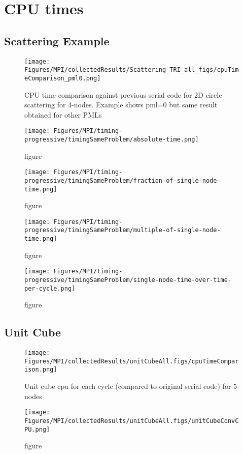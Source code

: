 \clearpage
\section{CPU times}
\subsection{Scattering Example}

\begin{figure}[!htb]
\texttt{[image: Figures/MPI/collectedResults/Scattering\_TRI\_all\_figs/cpuTimeComparison\_pml0.png]}
\caption{CPU time comparison against previous serial code for 2D circle scattering for 4-nodes. Example shows pml=0 but same result obtained for other PMLs}
\end{figure}

\begin{figure}[!htb]
\texttt{[image: Figures/MPI/timing-progressive/timingSameProblem/absolute-time.png]}
\caption{figure}
\end{figure}

\begin{figure}[!htb]
\texttt{[image: Figures/MPI/timing-progressive/timingSameProblem/fraction-of-single-node-time.png]}
\caption{figure}
\end{figure}


\begin{figure}[!htb]
\texttt{[image: Figures/MPI/timing-progressive/timingSameProblem/multiple-of-single-node-time.png]}
\caption{figure}
\end{figure}


\begin{figure}[!htb]
\texttt{[image: Figures/MPI/timing-progressive/timingSameProblem/single-node-time-over-time-per-cycle.png]}
\caption{figure}
\end{figure}

\clearpage
\subsection{Unit Cube}

\begin{figure}[!htb]
\texttt{[image: Figures/MPI/collectedResults/unitCubeAll.figs/cpuTimeComparison.png]}
\caption{Unit cube cpu for each cycle (compared to original serial code) for 5-nodes}
\end{figure}

\begin{figure}[!htb]
\texttt{[image: Figures/MPI/collectedResults/unitCubeAll.figs/unitCubeConvCPU.png]}
\caption{figure}
\end{figure}

